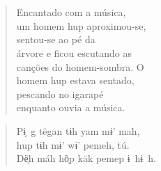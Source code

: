 \chapter*{}

\mbox{}\vspace*{\fill}

\begin{verse}
Encantado com a música,\\
um homem hup aproximou-se,\\
sentou-se ao pé da\\
árvore e ficou escutando as\\
canções do homem-sombra. O\\
homem hup estava sentado,\\
pescando no igarapé\\
enquanto ouvia a música.
\end{verse}

\begin{verse}
Pɨ̗~g tëgan tɨh yam mɨ’ mah,\\
hup tɨh mɨ’ wɨ’ pemeh, tú.\\
Dë̖h máh hõ̖p käk pemep ɨ~hɨ~h.
\end{verse}

\vspace*{\fill}

